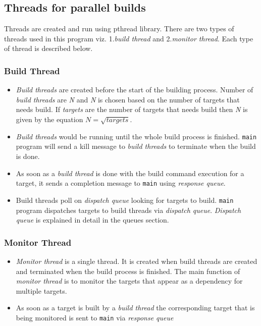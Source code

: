 \documentclass[12pt,letterpaper,titlepage, one-sided]{article}
\begin{document}
		\subsection{Threads for parallel builds}
		Threads are created and run using pthread library. There are two types of threads used in this program viz. 1.\textit{build thread} and 2.\textit{monitor thread}. Each type of thread is described below. 
		
		\subsubsection{Build Thread} 
		\begin{itemize}
		\item
		\textit{Build threads} are created before the start of the building process. Number of \textit{build threads} are \textit{N} and \textit{N} is chosen based on the number of targets that needs build. If \textit{targets} are the number of targets that needs build then \textit{N} is given by the equation $N = \sqrt{targets}$.
		\item
		\textit{Build threads} would be running until the whole build process is finished. \texttt{main} program will send a kill message to \textit{build threads} to terminate when the build is done.
		\item
		As soon as a \textit{build thread} is done with the build command execution for a target, it sends a completion message to \texttt{main} using \textit{response queue}.
		\item
		{Build threads} poll on \textit{dispatch queue} looking for targets to build. \texttt{main} program dispatches targets to build threads via \textit{dispatch queue}. \textit{Dispatch queue} is explained in detail in the queues section.
		\end{itemize}
		
		\subsubsection{Monitor Thread}
		\begin{itemize}
		\item
		\textit{Monitor thread} is a single thread. It is created when build threads are created and terminated when the build process is finished. The main function of \textit{monitor thread} is to monitor the targets that appear as a dependency for multiple targets.
		\item
		As soon as a target is built by a \textit{build thread} the corresponding	target that is being monitored is sent to \texttt{main} via \textit{response queue}
		\end{itemize}
	
\end{document}
